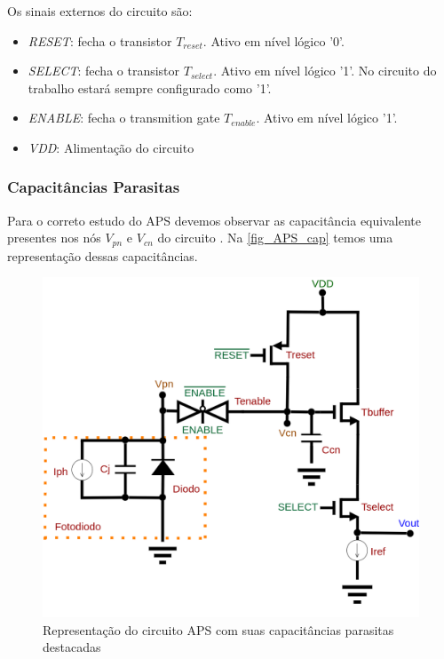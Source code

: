     Os sinais externos do circuito são:
    
\begin{itemize}
    \item \textit{RESET}: fecha o transistor $T_{reset}$. Ativo em n\'ivel l\'ogico '0'.
     \item \textit{SELECT}: fecha o transistor $T_{select}$. Ativo em n\'ivel l\'ogico '1'. No circuito do trabalho estar\'a sempre configurado como '1'.
     \item \textit{ENABLE}: fecha o transmition gate $T_{enable}$. Ativo em n\'ivel l\'ogico '1'.
     \item \textit{VDD}: Alimentação do circuito
\end{itemize}

\subsubsection{Capacit\^ancias Parasitas}
Para o correto estudo do APS devemos observar as capacit\^ancia equivalente presentes nos n\'os $V_{pn}$ e $V_{cn}$ do circuito \cite{LidianeCampos}. Na \autoref{fig_APS_cap} temos uma representação dessas capacit\^ancias.

\begin{figure}[!h]
	\caption{\label{fig_APS_cap}Representação do circuito APS com suas capacit\^ancias parasitas destacadas}
	\begin{center}
	    \includegraphics[scale=0.3]{Circuitos/APS_cap.png}
	\end{center}
\end{figure}

